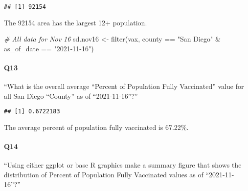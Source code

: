 \documentclass[
]{article}
\newenvironment{Shaded}{\begin{snugshade}}{\end{snugshade}}
\newcommand{\AttributeTok}[1]{\textcolor[rgb]{0.77,0.63,0.00}{#1}}
\newcommand{\CommentTok}[1]{\textcolor[rgb]{0.56,0.35,0.01}{\textit{#1}}}
\newcommand{\ConstantTok}[1]{\textcolor[rgb]{0.00,0.00,0.00}{#1}}
\newcommand{\FunctionTok}[1]{\textcolor[rgb]{0.00,0.00,0.00}{#1}}
\newcommand{\NormalTok}[1]{#1}
\newcommand{\OtherTok}[1]{\textcolor[rgb]{0.56,0.35,0.01}{#1}}
\newcommand{\SpecialCharTok}[1]{\textcolor[rgb]{0.00,0.00,0.00}{#1}}
\newcommand{\StringTok}[1]{\textcolor[rgb]{0.31,0.60,0.02}{#1}}
\begin{document}
\begin{verbatim}
## [1] 92154
\end{verbatim}

The 92154 area has the largest 12+ population.

\begin{Shaded}
\begin{Highlighting}[]
\CommentTok{\# All data for Nov 16}
\NormalTok{sd.nov16 }\OtherTok{\textless{}{-}} \FunctionTok{filter}\NormalTok{(vax, county }\SpecialCharTok{==} \StringTok{"San Diego"} \SpecialCharTok{\&}
\NormalTok{                as\_of\_date }\SpecialCharTok{==} \StringTok{"2021{-}11{-}16"}\NormalTok{)}
\end{Highlighting}
\end{Shaded}

\hypertarget{q13}{%
\paragraph{Q13}\label{q13}}

``What is the overall average ``Percent of Population Fully Vaccinated''
value for all San Diego ``County'' as of ``2021-11-16''?''

\begin{Shaded}
\end{Shaded}

\begin{verbatim}
## [1] 0.6722183
\end{verbatim}

The average percent of population fully vaccinated is 67.22\%.

\hypertarget{q14}{%
\paragraph{Q14}\label{q14}}

``Using either ggplot or base R graphics make a summary figure that
shows the distribution of Percent of Population Fully Vaccinated values
as of ``2021-11-16''?''

\begin{Shaded}
\end{Shaded}
\end{document}
